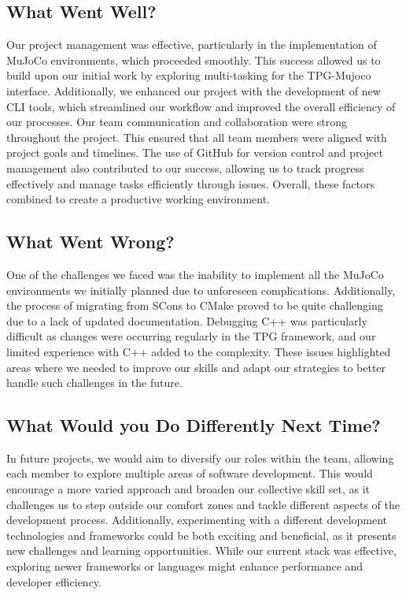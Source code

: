 \documentclass{article}
\begin{document}
\subsection{What Went Well?}


Our project management was effective, particularly in the implementation of MuJoCo environments, which proceeded smoothly. This success allowed us to build upon our initial work by exploring multi-tasking for the TPG-Mujoco interface. Additionally, we enhanced our project with the development of new CLI tools, which streamlined our workflow and improved the overall efficiency of our processes. Our team communication and collaboration were strong throughout the project. This ensured that all team members were aligned with project goals and timelines. The use of GitHub for version control and project management also contributed to our success, allowing us to track progress effectively and manage tasks efficiently through issues. Overall, these factors combined to create a productive working environment.
\subsection{What Went Wrong?}


One of the challenges we faced was the inability to implement all the MuJoCo environments we initially planned due to unforeseen complications. Additionally, the process of migrating from SCons to CMake proved to be quite challenging due to a lack of updated documentation. Debugging C++ was particularly difficult as changes were occurring regularly in the TPG framework, and our limited experience with C++ added to the complexity. These issues highlighted areas where we needed to improve our skills and adapt our strategies to better handle such challenges in the future.

\subsection{What Would you Do Differently Next Time?}


In future projects, we would aim to diversify our roles within the team, allowing each member to explore multiple areas of software development. This would encourage a more varied approach and broaden our collective skill set, as it challenges us to step outside our comfort zones and tackle different aspects of the development process. Additionally, experimenting with a different development technologies and frameworks could be both exciting and beneficial, as it presents new challenges and learning opportunities. While our current stack was effective, exploring newer frameworks or languages might enhance performance and developer efficiency.
\end{document}
